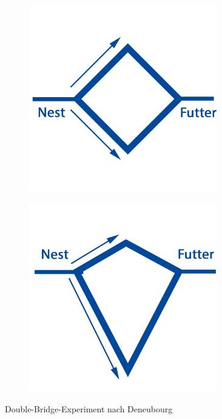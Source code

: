 \documentclass[doktyp=barbeit, sprache=german]{TUBAFarbeiten}
\begin{document}
\begin{figure}
\captionsetup[subfigure]{justification=centering}
\centering
\begin{subfigure}[c]{0.45\textwidth}
\includegraphics[width=0.9\textwidth]{images/RouteTrivial.png}
\end{subfigure}
\begin{subfigure}[c]{0.45\textwidth}
\includegraphics[width=0.9\textwidth]{images/RouteAdv.png}
\end{subfigure}
\caption{Double-Bridge-Experiment nach Deneubourg \cite{Biological}}
\label{img:DBExperiment}
\end{figure}
\end{document}
